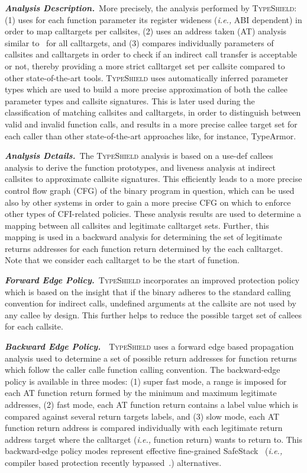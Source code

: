 \textbf{\textit{Analysis Description.}}~More precisely, the analysis performed by \textsc{TypeShield}:
(1) uses for each function parameter its register wideness (\textit{i.e.,} ABI dependent) in order to map calltargets per callsites,  
(2) uses an address taken (AT) analysis similar to~\cite{veen:typearmor} for all calltargets, and 
(3) compares individually parameters of callsites and calltargets in order to check if an indirect call transfer is acceptable or not, 
thereby providing a more strict calltarget set per callsite compared to other state-of-the-art tools.
\textsc{TypeShield} uses automatically inferred parameter types which are used to build 
a more precise approximation of both the callee parameter types and callsite signatures. 
This is later used during the classification of matching callsites and calltargets, in order to 
distinguish between valid and invalid function calls, and results in a more precise callee target 
set for each caller than other state-of-the-art approaches like, for instance, TypeArmor.

\textbf{\textit{Analysis Details.}}~The \textsc{TypeShield} analysis is based on a use-def callees analysis 
to derive the function prototypes, 
and liveness analysis at indirect callsites to approximate callsite signatures. This 
efficiently leads to a more precise control flow graph (CFG) of the binary program in question, 
which can be used also by other systems in order to gain a more precise CFG on which to 
enforce other types of CFI-related policies. These analysis results are used to
determine a mapping between all callsites and legitimate calltarget sets. Further,
this mapping is used in a backward analysis for determining the set of legitimate 
returns addresses for each function return determined by the each calltarget. Note that 
we consider each calltarget to be the start of function.

\textbf{\textit{Forward Edge Policy.}}~\textsc{TypeShield} incorporates an improved protection policy which is
based on the insight that if the binary adheres to the standard calling convention
for indirect calls, undefined arguments at the callsite are not used by any callee by design. 
This further helps to reduce the possible target set of callees for each callsite.

\textbf{\textit{Backward Edge Policy.}}~~\textsc{TypeShield} uses a forward edge based propagation analysis used to determine a 
set of possible return addresses for function returns which follow the caller calle function calling convention.
The backward-edge policy is available in three modes: 
(1) super fast mode, a range is imposed for each AT function return formed by the minimum and maximum legitimate addresses,
(2) fast mode, each AT function return contains a label value which is compared against several return targets labels, and
(3) slow mode, each AT function return address is compared individually with each legitimate return address target 
where the calltarget (\textit{i.e.,} function return) wants to return to.
This backward-edge policy modes represent effective fine-grained SafeStack~\cite{volodymyr:cpi} (\textit{i.e.,} 
compiler based protection recently bypassed~\cite{safestack:bypassing}.) alternatives. 

